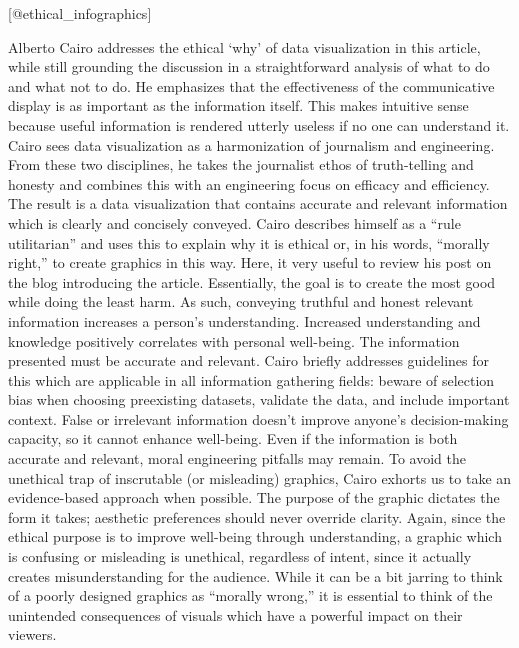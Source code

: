 \documentclass[]{book}
\theoremstyle{definition}
\theoremstyle{definition}
\theoremstyle{definition}
\theoremstyle{remark}
\begin{document}
{[}@ethical\_infographics{]}

Alberto Cairo addresses the ethical `why' of data visualization in this
article, while still grounding the discussion in a straightforward
analysis of what to do and what not to do. He emphasizes that the
effectiveness of the communicative display is as important as the
information itself. This makes intuitive sense because useful
information is rendered utterly useless if no one can understand it.
Cairo sees data visualization as a harmonization of journalism and
engineering. From these two disciplines, he takes the journalist ethos
of truth-telling and honesty and combines this with an engineering focus
on efficacy and efficiency. The result is a data visualization that
contains accurate and relevant information which is clearly and
concisely conveyed. Cairo describes himself as a ``rule utilitarian''
and uses this to explain why it is ethical or, in his words, ``morally
right,'' to create graphics in this way. Here, it very useful to review
his post on the blog introducing the article. Essentially, the goal is
to create the most good while doing the least harm. As such, conveying
truthful and honest relevant information increases a person's
understanding. Increased understanding and knowledge positively
correlates with personal well-being. The information presented must be
accurate and relevant. Cairo briefly addresses guidelines for this which
are applicable in all information gathering fields: beware of selection
bias when choosing preexisting datasets, validate the data, and include
important context. False or irrelevant information doesn't improve
anyone's decision-making capacity, so it cannot enhance well-being. Even
if the information is both accurate and relevant, moral engineering
pitfalls may remain. To avoid the unethical trap of inscrutable (or
misleading) graphics, Cairo exhorts us to take an evidence-based
approach when possible. The purpose of the graphic dictates the form it
takes; aesthetic preferences should never override clarity. Again, since
the ethical purpose is to improve well-being through understanding, a
graphic which is confusing or misleading is unethical, regardless of
intent, since it actually creates misunderstanding for the audience.
While it can be a bit jarring to think of a poorly designed graphics as
``morally wrong,'' it is essential to think of the unintended
consequences of visuals which have a powerful impact on their viewers.
\end{document}
